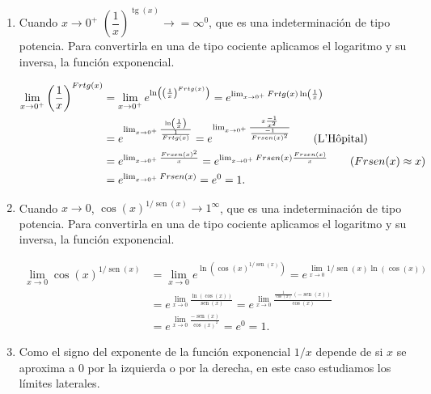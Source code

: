 \documentclass[
  spanish,
  a4paper,
]{scrreport}
\theoremstyle{definition}
\theoremstyle{remark}
\begin{document}
\begin{tcolorbox}
\begin{enumerate}
  \begin{align*}
  \lim_{x\to \infty} \sqrt[x]{x^2} 
  &= \lim_{x\to \infty} x^{2/x} = \lim_{x\to \infty} e^{\ln(x^{2/x})}\\
  & = e^{\lim_{x\to \infty} \frac{2\ln(x)}{x}} = e^{\lim_{x\to \infty} \frac{\frac{2}{x}}{1}} = 1.
  \end{align*}
\item
  Cuando \(x\to 0^+\)
  \(\left(\dfrac{1}{x}\right)^{\operatorname{tg}(x)} \to = \infty^0\),
  que es una indeterminación de tipo potencia. Para convertirla en una
  de tipo cociente aplicamos el logaritmo y su inversa, la función
  exponencial.

  \begin{align*}
  \lim_{x\to 0^+}\left(\dfrac{1}{x}\right)^{\operatorname{tg}(x)}
  &= \lim_{x\to 0^+}e^{\ln\left(\left(\frac{1}{x}\right)^{\operatorname{tg}(x)}\right)}
  = e^{\lim_{x\to 0^+} \operatorname{tg}(x) \ln\left(\frac{1}{x}\right)} \\
  &= e^{\lim_{x\to 0^+} \frac{\ln\left(\frac{1}{x}\right)}{\frac{1}{\operatorname{tg}(x)}}}
  = e^{\lim_{x\to 0^+} \frac{x\frac{-1}{x^2}}{\frac{-1}{\operatorname{sen}(x)^2}}} \tag{L'Hôpital} \\
  &= e^{\lim_{x\to 0^+} \frac{\operatorname{sen}(x)^2}{x}} 
  = e^{\lim_{x\to 0^+} \operatorname{sen}(x)\frac{\operatorname{sen}(x)}{x}} \tag{$\operatorname{sen}(x)\approx x$} \\
  &= e^{\lim_{x\to 0^+} \operatorname{sen}(x)} 
  = e^0
  = 1.
  \end{align*}
\item
  Cuando \(x\to 0\), \(\cos(x)^{1/\operatorname{sen}(x)} \to 1^\infty\),
  que es una indeterminación de tipo potencia. Para convertirla en una
  de tipo cociente aplicamos el logaritmo y su inversa, la función
  exponencial.

  \begin{align*}
  \lim_{x\to 0}\cos (x)^{1/\operatorname{sen}(x)} 
  &= \lim_{x\to 0}e^{\ln\left(\cos(x)^{1/\operatorname{sen}(x)}\right)}  
  =  e^{\lim_{x\to 0}1/\operatorname{sen}(x)\ln(\cos(x))} \\
  &= e^{\lim_{x\to 0}\frac{\ln(\cos(x))}{\operatorname{sen}(x)}}
  = e^{\lim_{x\to 0}\frac{\frac{1}{\cos(x)}(-\operatorname{sen}(x))}{\cos(x)}} \tag{L'Hôpital} \\
  &= e^{\lim_{x\to 0}\frac{-\operatorname{sen}(x)}{\cos(x)^2}}
  = e^0
  = 1.
  \end{align*}
\item
  Como el signo del exponente de la función exponencial \(1/x\) depende
  de si \(x\) se aproxima a \(0\) por la izquierda o por la derecha, en
  este caso estudiamos los límites laterales.


\end{enumerate}
\end{tcolorbox}
\end{document}
